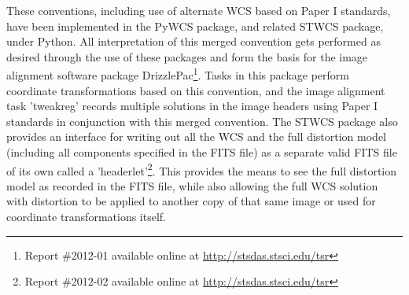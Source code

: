 These conventions, including use of alternate WCS based on Paper I standards, have been implemented in the PyWCS package, and related STWCS package, under Python. All interpretation of this merged convention gets performed as desired through the use of these packages and form the basis for the image alignment software package DrizzlePac\citep{hack_fc}\footnote{Report \#2012-01 available online at \url{http://stsdas.stsci.edu/tsr}}. Tasks in this package perform coordinate transformations based on this convention, and the image alignment task 'tweakreg' records multiple solutions in the image headers using Paper I standards in conjunction with this merged convention. The STWCS package also provides an interface for writing out all the WCS and the full distortion model (including all components specified in the FITS file) as a separate valid FITS file of its own called a 'headerlet'\citep{hack_hlet}\footnote{Report \#2012-02 available online at \url{http://stsdas.stsci.edu/tsr}}.  This provides the means to see the full distortion model as recorded in the FITS file, while also allowing the full WCS solution with distortion to be applied to another copy of that same image or used for coordinate transformations itself.

